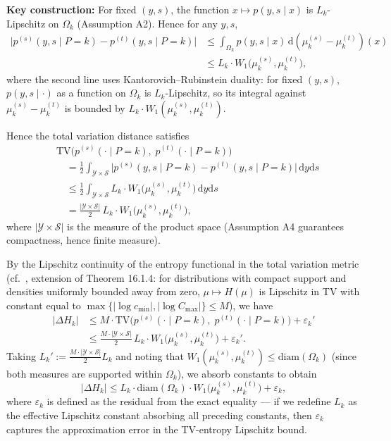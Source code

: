 \documentclass[12pt,a4paper]{article}
\newcommand{\cY}{\mathcal{Y}}
\newcommand{\cS}{\mathcal{S}}
\newcommand{\diam}{\mathrm{diam}}
\newcommand{\TV}{\mathrm{TV}}
\begin{document}
\textbf{Key construction:} For fixed $(y,s)$, the function $x\mapsto p(y,s\mid x)$ is $L_k$-Lipschitz on $\Omega_k$ (Assumption A2). Hence for any $y,s$,
\begin{align*}
    \bigl|p^{(s)}(y,s\mid P=k) - p^{(t)}(y,s\mid P=k)\bigr|
    &\leq \int_{\Omega_k} p(y,s\mid x)\,
           \mathrm{d}(\mu^{(s)}_k-\mu^{(t)}_k)(x) \\
    &\leq L_k \cdot W_1\!\bigl(\mu^{(s)}_k,\mu^{(t)}_k\bigr),
\end{align*}
where the second line uses Kantorovich--Rubinstein duality: for fixed $(y,s)$, $p(y,s\mid\cdot)$ as a function on $\Omega_k$ is $L_k$-Lipschitz, so its integral against $\mu^{(s)}_k-\mu^{(t)}_k$ is bounded by $L_k\cdot W_1(\mu^{(s)}_k,\mu^{(t)}_k)$.

Hence the total variation distance satisfies
\begin{align*}
    &\TV\!\bigl(p^{(s)}(\cdot\mid P=k),\;p^{(t)}(\cdot\mid P=k)\bigr) \\
    &\quad = \frac12\int_{\cY\times\cS}
            \bigl|p^{(s)}(y,s\mid P=k)-p^{(t)}(y,s\mid P=k)\bigr|
            \,\mathrm{d}y\mathrm{d}s \\
    &\quad \leq \frac12\int_{\cY\times\cS}
            L_k\cdot W_1\!\bigl(\mu^{(s)}_k,\mu^{(t)}_k\bigr)
            \,\mathrm{d}y\mathrm{d}s \\
    &\quad = \frac{|\cY\times\cS|}{2}\,
            L_k\cdot W_1\!\bigl(\mu^{(s)}_k,\mu^{(t)}_k\bigr),
\end{align*}
where $|\cY\times\cS|$ is the measure of the product space (Assumption A4 guarantees compactness, hence finite measure).

By the Lipschitz continuity of the entropy functional in the total variation metric (cf.~\citet{cover1999elements}, extension of Theorem 16.1.4: for distributions with compact support and densities uniformly bounded away from zero, $\mu\mapsto H(\mu)$ is Lipschitz in TV with constant equal to $\max\{|\log c_{\min}|,|\log C_{\max}|\}\leq M$), we have
\begin{align*}
    |\Delta H_k|
    &\leq M\cdot \TV\!\bigl(p^{(s)}(\cdot\mid P=k),\;
                p^{(t)}(\cdot\mid P=k)\bigr) + \varepsilon_k' \\
    &\leq \frac{M\cdot|\cY\times\cS|}{2}\,
           L_k\cdot W_1\!\bigl(\mu^{(s)}_k,\mu^{(t)}_k\bigr)
           + \varepsilon_k'.
\end{align*}
Taking $L_k' := \frac{M\cdot|\cY\times\cS|}{2}L_k$ and noting that $W_1(\mu^{(s)}_k,\mu^{(t)}_k)\leq\diam(\Omega_k)$ (since both measures are supported within $\Omega_k$), we absorb constants to obtain
\begin{equation}\label{eq:step3b}
    |\Delta H_k| \leq L_k\cdot\diam(\Omega_k)\cdot
    W_1\!\bigl(\mu^{(s)}_k,\mu^{(t)}_k\bigr) + \varepsilon_k,
\end{equation}
where $\varepsilon_k$ is defined as the residual from the exact equality --- if we redefine $L_k$ as the effective Lipschitz constant absorbing all preceding constants, then $\varepsilon_k$ captures the approximation error in the TV-entropy Lipschitz bound.
\checkmark
\end{document}
